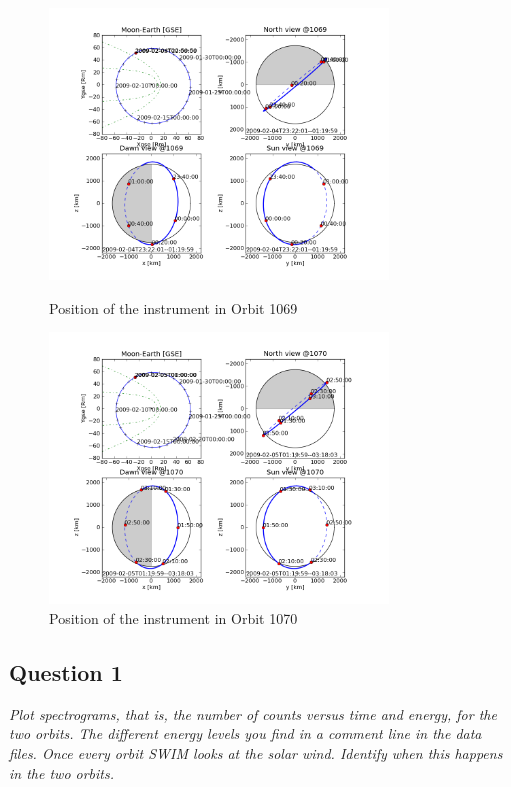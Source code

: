 \documentclass{article}
\begin{document}
\begin{figure}[htb!]
\begin{minipage}[c]{0.5\linewidth}
\centering
\includegraphics[width=9cm]{Figures/orbit_1069.png}
\caption{Position of the instrument in Orbit 1069}
\label{fig:orbit_1069}
\end{minipage}
\hspace{0.2cm}
\begin{minipage}[c]{0.5\linewidth}
\centering
\includegraphics[width=9cm]{Figures/orbit_1070.png}
\caption{Position of the instrument in Orbit 1070}
\label{fig:orbit_1070}
\end{minipage}
\end{figure}


\subsection{Question 1}
\textit{Plot spectrograms, that is, the number of counts versus time and energy, for the
two orbits. The different energy levels you find in a comment line in the data files.
Once every orbit SWIM looks at the solar wind. Identify when this happens in the two
orbits.}
\end{document}
